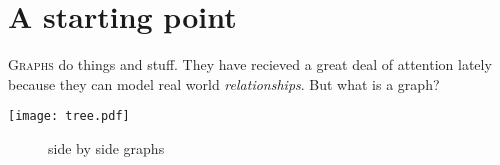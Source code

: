 \chapter{A starting point}
\lettrine[lines=4]{G}{raphs} do things and stuff.  They have recieved a great
deal of attention lately because they can model real world \textit{relationships}.  But what is
a graph?  

\texttt{[image: tree.pdf]}

\begin{figure}%
    \centering
    \qquad

    \caption{side by side graphs}%
    \label{fig:k5}%
\end{figure}

